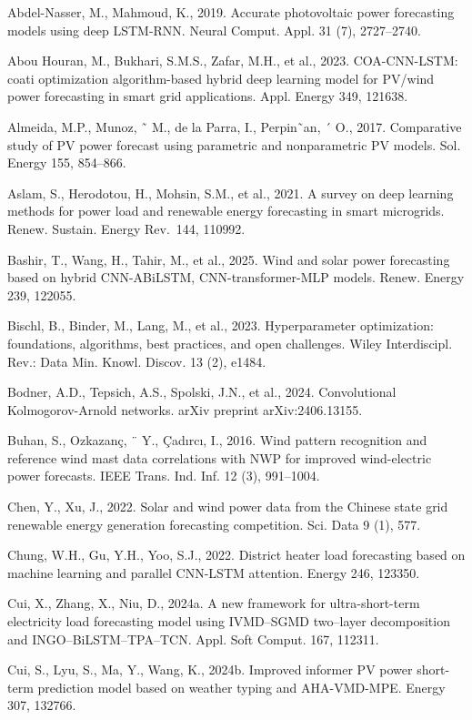 \documentclass[
  10
]{article}
\begin{document}
Abdel-Nasser, M., Mahmoud, K., 2019. Accurate photovoltaic power
forecasting models using deep LSTM-RNN. Neural Comput. Appl. 31 (7),
2727--2740.

Abou Houran, M., Bukhari, S.M.S., Zafar, M.H., et al., 2023.
COA-CNN-LSTM: coati optimization algorithm-based hybrid deep learning
model for PV/wind power forecasting in smart grid applications. Appl.
Energy 349, 121638.

Almeida, M.P., Munoz, ˜ M., de la Parra, I., Perpin˜an, ´ O., 2017.
Comparative study of PV power forecast using parametric and
nonparametric PV models. Sol. Energy 155, 854--866.

Aslam, S., Herodotou, H., Mohsin, S.M., et al., 2021. A survey on deep
learning methods for power load and renewable energy forecasting in
smart microgrids. Renew. Sustain. Energy Rev.~144, 110992.

Bashir, T., Wang, H., Tahir, M., et al., 2025. Wind and solar power
forecasting based on hybrid CNN-ABiLSTM, CNN-transformer-MLP models.
Renew. Energy 239, 122055.

Bischl, B., Binder, M., Lang, M., et al., 2023. Hyperparameter
optimization: foundations, algorithms, best practices, and open
challenges. Wiley Interdiscipl. Rev.: Data Min. Knowl. Discov. 13 (2),
e1484.

Bodner, A.D., Tepsich, A.S., Spolski, J.N., et al., 2024. Convolutional
Kolmogorov-Arnold networks. arXiv preprint arXiv:2406.13155.

Buhan, S., Ozkazanç, ¨ Y., Çadırcı, I., 2016. Wind pattern recognition
and reference wind mast data correlations with NWP for improved
wind-electric power forecasts. IEEE Trans. Ind. Inf. 12 (3), 991--1004.

Chen, Y., Xu, J., 2022. Solar and wind power data from the Chinese state
grid renewable energy generation forecasting competition. Sci. Data 9
(1), 577.

Chung, W.H., Gu, Y.H., Yoo, S.J., 2022. District heater load forecasting
based on machine learning and parallel CNN-LSTM attention. Energy 246,
123350.

Cui, X., Zhang, X., Niu, D., 2024a. A new framework for ultra-short-term
electricity load forecasting model using IVMD--SGMD two--layer
decomposition and INGO--BiLSTM--TPA--TCN. Appl. Soft Comput. 167,
112311.

Cui, S., Lyu, S., Ma, Y., Wang, K., 2024b. Improved informer PV power
short-term prediction model based on weather typing and AHA-VMD-MPE.
Energy 307, 132766.
\end{document}

